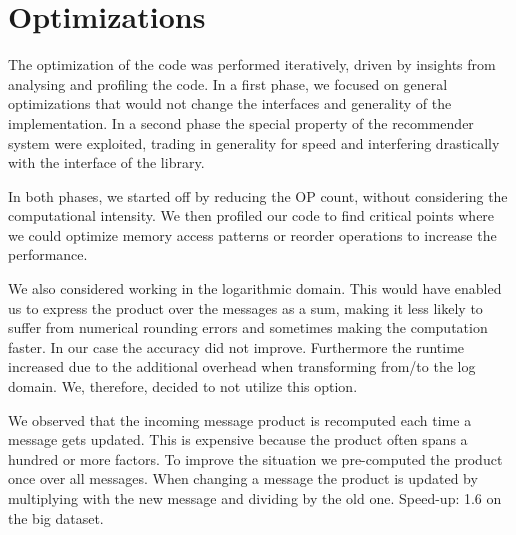 \section{Optimizations}\label{sec:method}



The optimization of the code was performed iteratively, driven by insights from analysing and profiling the code. In a first phase, we focused on general optimizations that would not change the interfaces and generality of the implementation. In a second phase the special property of the recommender system were exploited, trading in generality for speed and interfering drastically with the interface of the library.

In both phases, we started off by reducing the OP count, without considering the computational intensity. We then profiled our code to find critical points where we could optimize memory access patterns or reorder operations to increase the performance.

We also considered working in the logarithmic domain. This would have enabled us to express the product over the messages as a sum,  making it less likely to suffer from numerical rounding errors and sometimes making the computation faster. In our case the accuracy did not improve. Furthermore the runtime increased due to the additional overhead when transforming from/to the log domain. We, therefore, decided to not utilize this option.

We observed that the incoming message product is recomputed each time a message gets updated. This is expensive because the product often spans a hundred or more factors. To improve the situation we pre-computed the product once over all messages. When changing a message the product is updated by multiplying with the new message and dividing by the old one. 
Speed-up: 1.6 on the big dataset.

